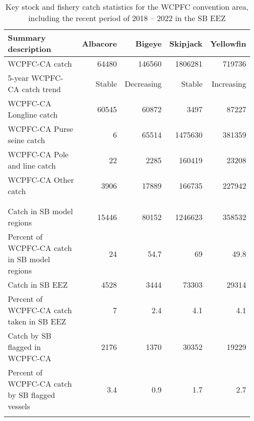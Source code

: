 \begin{longtable}{lrrrr}
\caption{Key stock and fishery catch statistics for the WCPFC convention area, including the recent period of 2018 -- 2022 in the SB EEZ} \\ 
  \hline
Summary description & Albacore & Bigeye & Skipjack & Yellowfin \\ 
  \hline
WCPFC-CA catch & 64480 & 146560 & 1806281 & 719736 \\ 
  5-year WCPFC-CA catch trend & Stable & Decreasing & Stable & Increasing \\ 
  WCPFC-CA Longline catch & 60545 & 60872 & 3497 & 87227 \\ 
  WCPFC-CA Purse seine catch & 6 & 65514 & 1475630 & 381359 \\ 
  WCPFC-CA Pole and line catch & 22 & 2285 & 160419 & 23208 \\ 
  WCPFC-CA Other catch & 3906 & 17889 & 166735 & 227942 \\ 
   &  &  &  &  \\ 
   \hline
 &  &  &  &  \\ 
  Catch in SB model regions & 15446 & 80152 & 1246623 & 358532 \\ 
  Percent of WCPFC-CA catch in SB model regions & 24 & 54.7 & 69 & 49.8 \\ 
  Catch in SB EEZ & 4528 & 3444 & 73303 & 29314 \\ 
  Percent of WCPFC-CA catch taken in SB EEZ & 7 & 2.4 & 4.1 & 4.1 \\ 
  Catch by SB flagged in WCPFC-CA & 2176 & 1370 & 30352 & 19229 \\ 
  Percent of WCPFC-CA catch by SB flagged vessels & 3.4 & 0.9 & 1.7 & 2.7 \\ 
  \hline
\label{cat_sum_tab}
\end{longtable}
